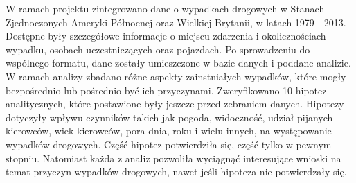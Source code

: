 W ramach projektu zintegrowano dane o wypadkach drogowych w Stanach Zjednoczonych Ameryki Północnej oraz Wielkiej Brytanii, w latach 1979 - 2013. Dostępne były szczegółowe informacje o miejscu zdarzenia i okolicznościach wypadku, osobach uczestniczących oraz pojazdach. Po sprowadzeniu do wspólnego formatu, dane zostały umieszczone w bazie danych i poddane analizie. W ramach analizy zbadano różne aspekty zainstniałych wypadków, które mogły bezpośrednio lub pośrednio być ich przyczynami. Zweryfikowano 10 hipotez analitycznych, które postawione były jeszcze przed zebraniem danych. Hipotezy dotyczyły wpływu czynników takich jak pogoda, widoczność, udział pijanych kierowców, wiek kierowców, pora dnia, roku i wielu innych, na występowanie wypadków drogowych. Część hipotez potwierdziła się, część tylko w pewnym stopniu. Natomiast każda z analiz pozwoliła wyciągnąć interesujące wnioski na temat przyczyn wypadków drogowych, nawet jeśli hipoteza nie potwierdzały się.